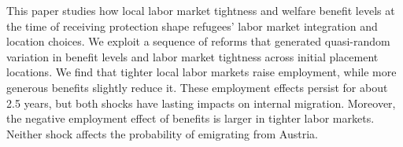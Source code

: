 This paper studies how local labor market tightness and welfare benefit levels at the time of receiving protection shape refugees’ labor market integration and location choices. We exploit a sequence of reforms that generated quasi-random variation in benefit levels and labor market tightness across initial placement locations. We find that tighter local labor markets raise employment, while more generous benefits slightly reduce it. These employment effects persist for about 2.5 years, but both shocks have lasting impacts on internal migration. Moreover, the negative employment effect of benefits is larger in tighter labor markets. Neither shock affects the probability of emigrating from Austria.
